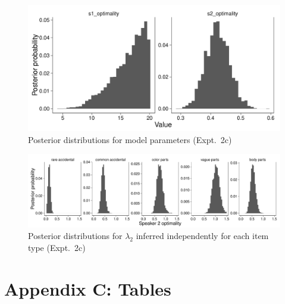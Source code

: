 \documentclass[12pt,letterpaper]{article}
\begin{document}
\begin{figure}[h]
\centering
    \includegraphics[width=\columnwidth]
    {unfamiliar-asymmetry-parameters.pdf}
    \caption{
    Posterior distributions for model parameters (Expt.~2c)
}
  \label{fig:asymmetry-params}
\end{figure}

\begin{figure}[h]
\centering
    \includegraphics[width=\columnwidth]
    {unfamiliar-asymmetry-byItem-parameters.pdf}
    \caption{
    Posterior distributions for $\lambda_2$ inferred independently for each item type (Expt.~2c)
}
  \label{fig:asymmetry-params-byItem}
\end{figure}

\newpage

\section*{Appendix C: Tables}
\end{document}
